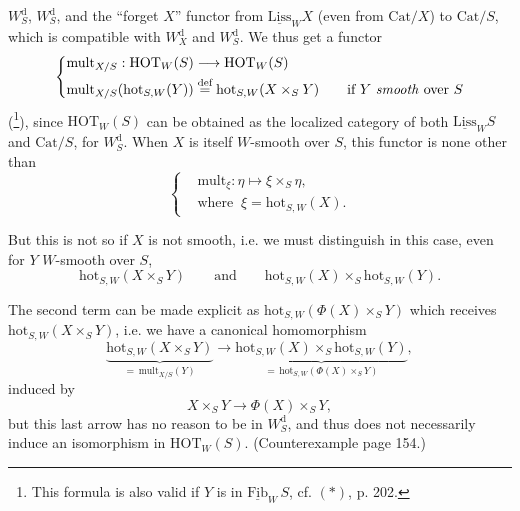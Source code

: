 \setcounter{footnote}{97}


$W_S^{\mathrm{d}}$, $W_S^{\mathrm{d}}$, and the ``forget $X$'' functor from $\underline{\mathrm{Liss}}_W X$ (even from $\mathrm{Cat}/X$) to $\mathrm{Cat}/S$, which is compatible with $W_X^{\mathrm{d}}$ and $W_S^{\mathrm{d}}$. We thus get a functor %
\[
\left\{\begin{aligned}
&\mathrm{mult}_{X/S} : \mathrm{HOT}_W(S) \longrightarrow \mathrm{HOT}_W(S)\\
&\mathrm{mult}_{X/S}(\mathrm{hot}_{S,W}(Y)) \overset{\text{def}}{=} \mathrm{hot}_{S,W}(X\times_S Y) \qquad \text{if $Y$ \textit{smooth} over $S$}
\end{aligned}\right.
\]
(\footnote{This formula is also valid if $Y$ is in $\underline{\mathrm{Fib}}_W\, S$, cf. $(*)$, p. 202.}), since $\mathrm{HOT}_W(S)$ can be obtained as the localized category of both $\underline{\mathrm{Liss}}_W S$ and $\mathrm{Cat}/S$, for $W_S^{\mathrm{d}}$. When $X$ is itself $W$-smooth over $S$, this functor is none other than
\[
\left\{\begin{aligned}
&\mathrm{mult}_\xi : \eta \longmapsto \xi\times_S \eta,\\
&\text{where }\ \xi = \mathrm{hot}_{S,W}(X).
\end{aligned}\right.
\]

But this is not so if $X$ is not smooth, i.e. we must distinguish in this case, even for $Y$ $W$-smooth over $S$,
\[
\mathrm{hot}_{S,W}(X\times_S Y) \qquad\text{and}\qquad \mathrm{hot}_{S,W}(X)\times_S \mathrm{hot}_{S,W}(Y).
\]

The second term can be made explicit as $\mathrm{hot}_{S,W}(\Phi(X)\times_S Y)$ which receives $\mathrm{hot}_{S,W}(X\times_S Y)$, i.e.
we have a canonical homomorphism
\[
\underbrace{\mathrm{hot}_{S,W}(X\times_S Y)}_{=\,\mathrm{mult}_{X/S}(Y)} \longrightarrow \underbrace{\mathrm{hot}_{S,W}(X)\times_S \mathrm{hot}_{S,W}(Y)}_{=\,\mathrm{hot}_{S,W}(\Phi(X)\times_S Y)},
\]
induced by
\[
X\times_S Y \longrightarrow \Phi(X)\times_S Y,
\]
but this last arrow has no reason to be in $W_S^{\mathrm{d}}$, and thus does not necessarily induce an isomorphism in $\mathrm{HOT}_W(S)$. (Counterexample page 154.)


